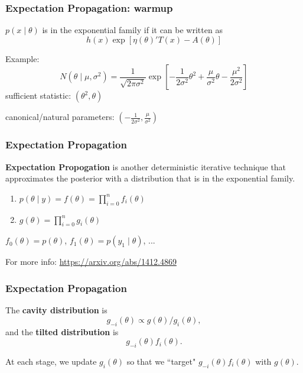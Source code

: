 \documentclass{beamer}
\begin{document}
\begin{frame}[fragile]
\frametitle{Expectation Propagation: warmup}

$p(x \mid \theta)$ is in the exponential family if it can be written as  
$$
h(x)\exp\left[\eta(\theta)'T(x) - A(\theta) \right]
$$

Example:
$$
N(\theta \mid \mu, \sigma^2) = \frac{1}{\sqrt{2\pi\sigma^2}} \exp\left[-\frac{1}{2\sigma^2}\theta^2 + \frac{\mu}{\sigma^2}\theta - \frac{\mu^2}{2\sigma^2} \right]
$$
sufficient statistic: $(\theta^2,\theta)$

canonical/natural parameters: $(-\frac{1}{2\sigma^2}, \frac{\mu}{\sigma^2})$

\end{frame}
\begin{frame}[fragile]
\frametitle{Expectation Propagation}

{\bf Expectation Propogation} is another deterministic iterative technique that approximates the posterior with a distribution that is in the exponential family. 
\newline

\begin{enumerate}
\item $p(\theta \mid y) = f(\theta) = \prod_{i=0}^{n} f_i(\theta)$
\item $g(\theta) = \prod_{i=0}^{n} g_i(\theta)$
\end{enumerate}

$f_0(\theta) = p(\theta)$, $f_1(\theta) = p(y_1 \mid \theta)$, ...
\newline

For more info: \url{https://arxiv.org/abs/1412.4869}
\end{frame}
\begin{frame}[fragile]
\frametitle{Expectation Propagation}

The {\bf cavity distribution} is 
$$
g_{-i}(\theta) \propto g(\theta) / g_i(\theta),
$$
and the {\bf tilted distribution} is 
$$
g_{-i}(\theta) f_i(\theta).
$$

At each stage, we update $g_i(\theta)$ so that we ``target" $g_{-i}(\theta) f_i(\theta)$ with $g(\theta)$. 


\end{frame}
\end{document}
